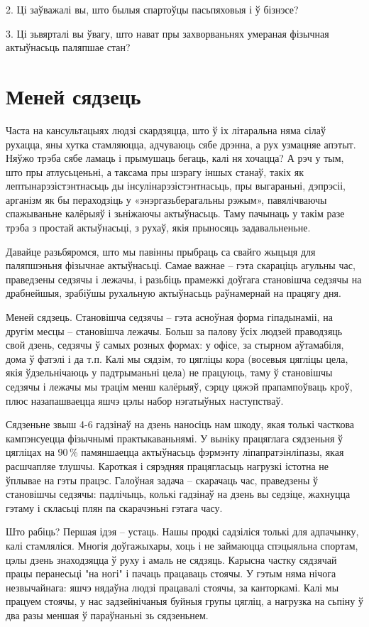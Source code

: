 2. Ці заўважалі вы, што былыя спартоўцы пасьпяховыя і ў бізнэсе?

3. Ці зьвярталі вы ўвагу, што нават пры захворваньнях умераная фізычная актыўнасьць паляпшае стан?


\section{Меней сядзець}

Часта на кансультацыях людзі скардзяцца, што ў іх літаральна няма сілаў рухацца, яны хутка стамляюцца, адчуваюць сябе дрэнна, а рух узмацняе апэтыт. Няўжо трэба сябе ламаць і прымушаць бегаць, калі ня хочацца? А рэч у тым, што пры атлусьценьні, а таксама пры шэрагу іншых станаў, такіх як лептынарэзістэнтнасьць ды інсулінарэзістэнтнасьць, пры выгараньні, дэпрэсіі, арганізм як бы пераходзіць у «энэргазьберагальны рэжым», павялічваючы спажываньне калёрыяў і зьніжаючы актыўнасьць. Таму пачынаць у такім разе трэба з простай актыўнасьці, з рухаў, якія прыносяць задавальненьне.

Давайце разьбяромся, што мы павінны прыбраць са свайго жыцьця для паляпшэньня фізычнае актыўнасьці. Самае важнае – гэта скараціць агульны час, праведзены седзячы і лежачы, і разьбіць прамежкі доўгага становішча седзячы на драбнейшыя, зрабіўшы рухальную актыўнасьць раўнамернай на працягу дня.

Меней сядзець. Становішча седзячы – гэта асноўная форма гіпадынаміі, на другім месцы – становішча лежачы. Больш за палову ўсіх людзей праводзяць свой дзень, седзячы ў самых розных формах: у офісе, за стырном аўтамабіля, дома ў фатэлі і да т.п. Калі мы сядзім, то цягліцы кора (восевыя цягліцы цела, якія ўдзельнічаюць у падтрыманьні цела) не працуюць, таму ў становішчы седзячы і лежачы мы трацім менш калёрыяў, сэрцу цяжэй прапампоўваць кроў, плюс назапашваецца яшчэ цэлы набор нэгатыўных наступстваў.

Сядзеньне звыш 4-6 гадзінаў на дзень наносіць нам шкоду, якая толькі часткова кампэнсуецца фізычнымі практыкаваньнямі. У выніку працяглага сядзеньня ў цягліцах на 90\,\% памяншаецца актыўнасьць фэрмэнту ліпапратэінліпазы, якая расшчапляе тлушчы. Кароткая і сярэдняя працягласьць нагрузкі істотна не ўплывае на гэты працэс. Галоўная задача – скарачаць час, праведзены ў становішчы седзячы: падлічыць, колькі гадзінаў на дзень вы седзіце, жахнуцца гэтаму і скласьці плян па скарачэньні гэтага часу.

Што рабіць? Першая ідэя – устаць. Нашы продкі садзіліся толькі для адпачынку, калі стамляліся. Многія доўгажыхары, хоць і не займаюцца спэцыяльна спортам, цэлы дзень знаходзяцца ў руху і амаль не сядзяць. Карысна частку сядзячай працы перанесьці "на ногі" і пачаць працаваць стоячы. У гэтым няма нічога незвычайнага: яшчэ нядаўна людзі працавалі стоячы, за канторкамі. Калі мы працуем стоячы, у нас задзейнічаныя буйныя групы цягліц, а нагрузка на сьпіну ў два разы меншая ў параўнаньні зь сядзеньнем.

